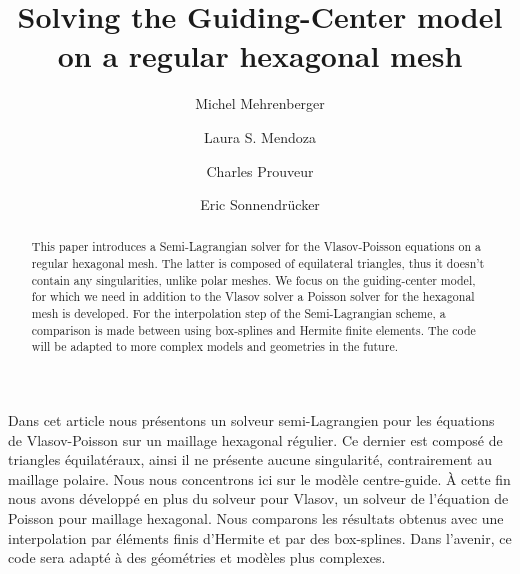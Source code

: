 \documentclass[proc]{edpsmath}
\begin{document}

\title{Solving the Guiding-Center model\\on a regular hexagonal mesh}%
%
\author{Michel Mehrenberger} \address{IRMA, Universit\'e de Strasbourg, 7, rue Ren\'e Descartes, 67084 Strasbourg \& INRIA-Nancy Grand-Est, projet TONUS, 
}
\author{Laura S. Mendoza} \address{Max-Planck-Institut f\"{u}r Plasmaphysik, Boltzmannstr. 2, D-85748 Garching, Germany. } 
\author{Charles Prouveur}\address{Universit\'e de Lyon, UMR5208, Institut Camille Jordan,
43 boulevard 11 novembre 1918, F-69622 Villeurbanne cedex, France.  }
\author{Eric Sonnendr\"{u}cker}
%
%


\begin{abstract} 
This paper introduces a Semi-Lagrangian solver for the Vlasov-Poisson equations on a regular hexagonal mesh. The latter is composed of equilateral triangles, thus it doesn't contain any singularities, unlike polar meshes. We focus on the guiding-center model, for which we need in addition to the Vlasov solver a Poisson solver for the hexagonal mesh is developed. For the interpolation step of the Semi-Lagrangian scheme, a comparison is made between using box-splines and Hermite finite elements. The code will be adapted  to more complex models and geometries in the future.
\end{abstract}

\begin{resume} 
Dans cet article nous pr\'esentons un solveur semi-Lagrangien pour les \'equations de Vlasov-Poisson sur un maillage hexagonal r\'egulier. Ce dernier est compos\'e de triangles \'equilat\'eraux, ainsi il ne pr\'esente aucune singularit\'e, contrairement au maillage polaire. Nous nous concentrons ici sur le mod\`ele centre-guide. \`A cette fin nous avons d\'evelopp\'e en plus du solveur pour Vlasov, un solveur de l'\'equation de Poisson pour maillage hexagonal. Nous comparons les r\'esultats obtenus avec une interpolation par  \'el\'ements finis d'Hermite et par des box-splines.   Dans l'avenir, ce code sera adapt\'e \`a des g\'eom\'etries et mod\`eles plus complexes.  
\end{resume}
\end{document}
